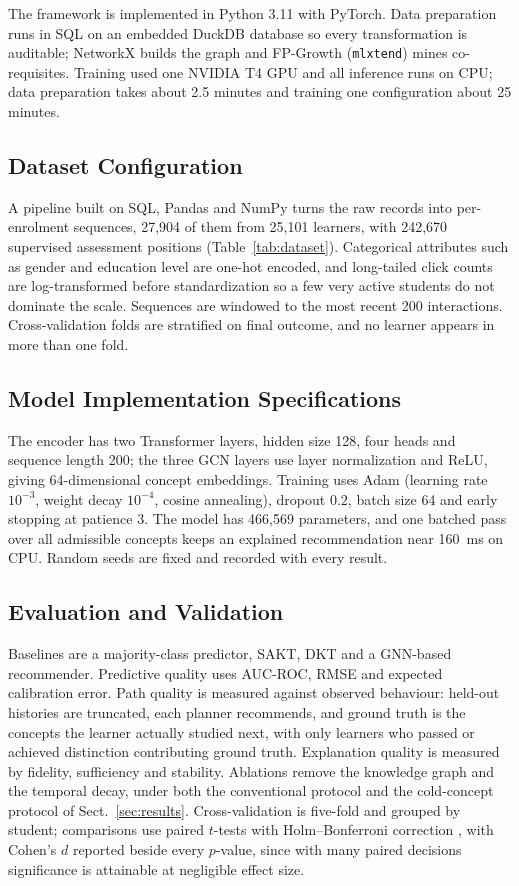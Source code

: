 \documentclass[graybox]{SNmult}
\begin{document}
The framework is implemented in Python 3.11 with PyTorch. Data preparation runs in SQL on an
embedded DuckDB database so every transformation is auditable; NetworkX builds the graph and
FP-Growth (\texttt{mlxtend}) mines co-requisites. Training used one NVIDIA T4 GPU and all
inference runs on CPU; data preparation takes about 2.5 minutes and training one
configuration about 25 minutes.

\subsection{Dataset Configuration}
\label{subsec:config}

A pipeline built on SQL, Pandas and NumPy turns the raw records into per-enrolment
sequences, 27{,}904 of them from 25{,}101 learners, with 242{,}670 supervised assessment
positions (Table~\ref{tab:dataset}). Categorical attributes such as gender and education
level are one-hot encoded, and long-tailed click counts are log-transformed before
standardization so a few very active students do not dominate the scale. Sequences are
windowed to the most recent 200 interactions. Cross-validation folds are stratified on final
outcome, and no learner appears in more than one fold.

\subsection{Model Implementation Specifications}
\label{subsec:specs}

The encoder has two Transformer layers, hidden size 128, four heads
and sequence length 200; the three GCN layers use layer normalization and ReLU, giving
64-dimensional concept embeddings. Training uses Adam (learning rate $10^{-3}$, weight decay
$10^{-4}$, cosine annealing), dropout $0.2$, batch size 64 and early stopping at patience 3.
The model has 466{,}569 parameters, and one batched pass over all admissible concepts keeps
an explained recommendation near 160~ms on CPU. Random seeds are fixed and recorded with
every result.

\subsection{Evaluation and Validation}
\label{subsec:eval}

Baselines are a majority-class predictor, SAKT, DKT and a GNN-based recommender. Predictive
quality uses AUC-ROC, RMSE and expected calibration error. Path quality is measured against
observed behaviour: held-out histories are truncated, each planner recommends, and ground
truth is the concepts the learner actually studied next, with only learners who passed or
achieved distinction contributing ground truth. Explanation quality is measured by
fidelity, sufficiency and stability. Ablations remove the knowledge graph and the temporal
decay, under both the conventional protocol and the cold-concept protocol of
Sect.~\ref{sec:results}. Cross-validation is five-fold and grouped by student; comparisons
use paired $t$-tests with Holm--Bonferroni correction \cite{holm1979}, with Cohen's $d$
reported beside every $p$-value, since with many paired decisions significance is attainable
at negligible effect size.
\end{document}
